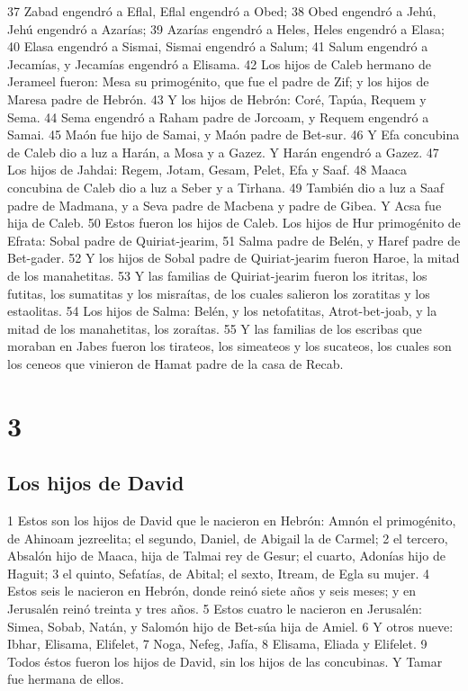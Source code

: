 37 Zabad engendró a Eflal, Eflal engendró a Obed;
38 Obed engendró a Jehú, Jehú engendró a Azarías;
39 Azarías engendró a Heles, Heles engendró a Elasa;
40 Elasa engendró a Sismai, Sismai engendró a Salum;
41 Salum engendró a Jecamías, y Jecamías engendró a Elisama.
42 Los hijos de Caleb hermano de Jerameel fueron: Mesa su primogénito, que fue el padre de Zif; y los hijos de Maresa padre de Hebrón.
43 Y los hijos de Hebrón: Coré, Tapúa, Requem y Sema.
44 Sema engendró a Raham padre de Jorcoam, y Requem engendró a Samai.
45 Maón fue hijo de Samai, y Maón padre de Bet-sur.
46 Y Efa concubina de Caleb dio a luz a Harán, a Mosa y a Gazez. Y Harán engendró a Gazez.
47 Los hijos de Jahdai: Regem, Jotam, Gesam, Pelet, Efa y Saaf.
48 Maaca concubina de Caleb dio a luz a Seber y a Tirhana.
49 También dio a luz a Saaf padre de Madmana, y a Seva padre de Macbena y padre de Gibea. Y Acsa fue hija de Caleb.
50 Estos fueron los hijos de Caleb. Los hijos de Hur primogénito de Efrata: Sobal padre de Quiriat-jearim,
51 Salma padre de Belén, y Haref padre de Bet-gader.
52 Y los hijos de Sobal padre de Quiriat-jearim fueron Haroe, la mitad de los manahetitas.
53 Y las familias de Quiriat-jearim fueron los itritas, los futitas, los sumatitas y los misraítas, de los cuales salieron los zoratitas y los estaolitas.
54 Los hijos de Salma: Belén, y los netofatitas, Atrot-bet-joab, y la mitad de los manahetitas, los zoraítas.
55 Y las familias de los escribas que moraban en Jabes fueron los tirateos, los simeateos y los sucateos, los cuales son los ceneos que vinieron de Hamat padre de la casa de Recab.

\chapter{3}

\section*{Los hijos de David}

 
1 Estos son los hijos de David que le nacieron en Hebrón: Amnón el primogénito, de Ahinoam jezreelita; el segundo, Daniel, de Abigail la de Carmel;
2 el tercero, Absalón hijo de Maaca, hija de Talmai rey de Gesur; el cuarto, Adonías hijo de Haguit;
3 el quinto, Sefatías, de Abital; el sexto, Itream, de Egla su mujer.
4 Estos seis le nacieron en Hebrón, donde reinó siete años y seis meses; y en Jerusalén reinó treinta y tres años. 
5 Estos cuatro le nacieron en Jerusalén: Simea, Sobab, Natán, y Salomón hijo de Bet-súa hija de Amiel.
6 Y otros nueve: Ibhar, Elisama, Elifelet,
7 Noga, Nefeg, Jafía,
8 Elisama, Eliada y Elifelet.
9 Todos éstos fueron los hijos de David, sin los hijos de las concubinas. Y Tamar fue hermana de ellos.
